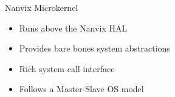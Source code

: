 		\begin{frame}[fragile]{Nanvix Microkernel}

			\begin{itemize}
				\item Runs above the Nanvix HAL
				\item Provides bare bones system abstractions
				\item Rich system call interface
				\item Follows a Master-Slave OS model
			\end{itemize}




		\end{frame}

